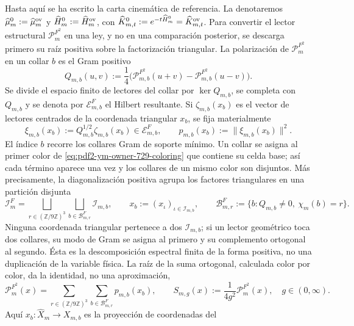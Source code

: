 Hasta aquí se ha escrito la carta cinemática de referencia. La denotaremos
$\widehat\mu_m^0:=\widehat\mu_m^{\rm ov}$ y
$\widehat H_m^0:=\widehat H_m^{\rm ov}$, con
$\widehat K_{m,t}^0:=e^{-t\widehat H_m^0}=\widehat K_{m,t}^{\rm ov}$.
Para convertir el lector estructural
$\mathcal P_m^{F^2}$ en una ley, y no en una comparación posterior, se descarga
primero su raíz positiva sobre la factorización triangular. La polarización de
$\mathcal P_m^{F^2}$ en un collar $b$ es el Gram positivo
\[
 Q_{m,b}(u,v):=\frac14\bigl(
 \mathcal P_{m,b}^{F^2}(u+v)-\mathcal P_{m,b}^{F^2}(u-v)
 \bigr).
\]
Se divide el espacio finito de lectores del collar por $\ker Q_{m,b}$, se completa
con $Q_{m,b}$ y se denota por $\mathcal E_{m,b}^{F}$ el Hilbert resultante. Si
$\zeta_{m,b}(x_b)$ es el vector de lectores centrados de la coordenada triangular
$x_b$, se fija materialmente
\begin{equation}\label{eq:pdf2-ym-action-root}
 \xi_{m,b}(x_b):=Q_{m,b}^{1/2}\zeta_{m,b}(x_b)
 \in\mathcal E_{m,b}^{F},
 \qquad
 p_{m,b}(x_b):=\|\xi_{m,b}(x_b)\|^2.
\end{equation}
El índice $b$ recorre los collares Gram de soporte mínimo. Un collar se asigna
al primer color de \eqref{eq:pdf2-ym-owner-729-coloring} que contiene su celda base;
así cada término aparece una vez y los collares de un mismo color son disjuntos.
Más precisamente, la diagonalización positiva agrupa los factores triangulares en
una partición disjunta
\begin{equation}\label{eq:pdf2-ym-action-factor-partition}
 \mathcal I_m^{F}
 =\bigsqcup_{r\in(\mathbb Z/9\mathbb Z)^3}
   \bigsqcup_{b\in\mathcal B_{m,r}^{F}}\mathcal I_{m,b},
 \qquad x_b:=(x_\iota)_{\iota\in\mathcal I_{m,b}},
 \qquad
 \mathcal B_{m,r}^{F}:=\{b:Q_{m,b}\ne0,\ \chi_m(b)=r\}.
\end{equation}
Ninguna coordenada triangular pertenece a dos $\mathcal I_{m,b}$; si un lector
geométrico toca dos collares, su modo de Gram se asigna al primero y su complemento
ortogonal al segundo. Ésta es la descomposición espectral finita de la forma positiva,
no una duplicación de la variable física.
La raíz de la suma ortogonal, calculada color por color, da la identidad, no una
aproximación,
\begin{equation}\label{eq:pdf2-ym-action-reader-sum}
 \mathcal P_m^{F^2}(x)
 =\sum_{r\in(\mathbb Z/9\mathbb Z)^3}
   \sum_{b\in\mathcal B_{m,r}^{F}}p_{m,b}(x_b),
 \qquad
 S_{m,g}(x):=\frac1{4g^2}\mathcal P_m^{F^2}(x),
 \quad g\in(0,\infty).
\end{equation}
Aquí $x_b:\widehat X_m\to X_{m,b}$ es la proyección de coordenadas del
